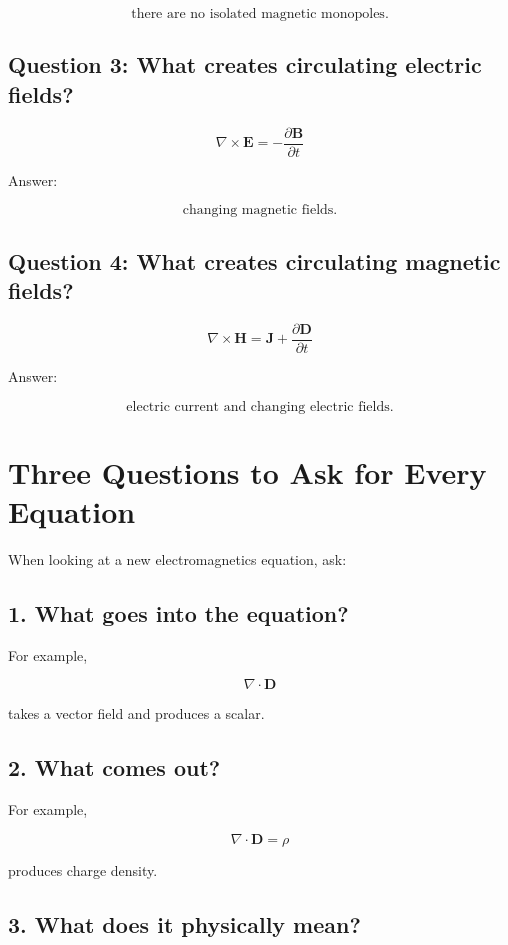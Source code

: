 \documentclass[11pt]{article}
\newcommand{\vect}[1]{\mathbf{#1}}
\begin{document}
\[
\text{there are no isolated magnetic monopoles}.
\]

\subsection*{Question 3: What creates circulating electric fields?}

\[
\boxed{
\nabla\times\vect{E}
=
-\frac{\partial\vect{B}}{\partial t}
}
\]

Answer:

\[
\text{changing magnetic fields}.
\]

\subsection*{Question 4: What creates circulating magnetic fields?}

\[
\boxed{
\nabla\times\vect{H}
=
\vect{J}
+
\frac{\partial\vect{D}}{\partial t}
}
\]

Answer:

\[
\text{electric current and changing electric fields}.
\]



\section{Three Questions to Ask for Every Equation}

When looking at a new electromagnetics equation, ask:

\subsection*{1. What goes into the equation?}

For example,

\[
\nabla\cdot\vect{D}
\]

takes a vector field and produces a scalar.

\subsection*{2. What comes out?}

For example,

\[
\nabla\cdot\vect{D}=\rho
\]

produces charge density.

\subsection*{3. What does it physically mean?}
\end{document}
